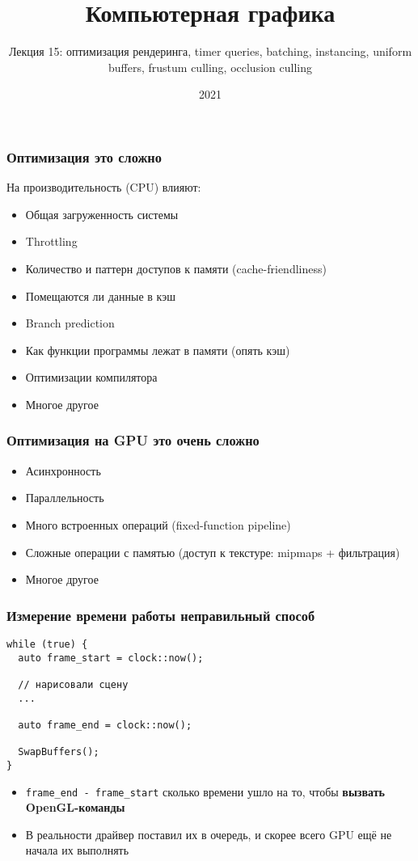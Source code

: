 \documentclass{beamer}
\title{Компьютерная графика}
\subtitle{Лекция 15: оптимизация рендеринга, timer queries, batching, instancing, uniform buffers, frustum culling, occlusion culling}
\date{2021}
\begin{document}
\frame{\titlepage}

\begin{frame}[fragile]
\frametitle{Оптимизация \textendash{} это сложно}
На производительность (CPU) влияют:
\pause
\begin{itemize}
\item Общая загруженность системы
\pause
\item Throttling
\pause
\item Количество и паттерн доступов к памяти (cache-friendliness)
\pause
\item Помещаются ли данные в кэш
\pause
\item Branch prediction
\pause
\item Как функции программы лежат в памяти (опять кэш)
\pause
\item Оптимизации компилятора
\pause
\item Многое другое
\end{itemize}
\end{frame}

\begin{frame}[fragile]
\frametitle{Оптимизация на GPU \textendash{} это очень сложно}
\begin{itemize}
\item Асинхронность
\pause
\item Параллельность
\pause
\item Много встроенных операций (fixed-function pipeline)
\pause
\item Сложные операции с памятью (доступ к текстуре: mipmaps + фильтрация)
\pause
\item Многое другое
\end{itemize}
\end{frame}

\begin{frame}[fragile]
\frametitle{Измерение времени работы \textendash{} неправильный способ}
\begin{verbatim}
while (true) {
  auto frame_start = clock::now();

  // нарисовали сцену
  ...

  auto frame_end = clock::now();

  SwapBuffers();
}
\end{verbatim}
\pause
\begin{itemize}
\item \verb|frame_end - frame_start| \textendash{} сколько времени ушло на то, чтобы \textbf{вызвать OpenGL-команды}
\pause
\item В реальности драйвер поставил их в очередь, и скорее всего GPU ещё не начала их выполнять
\end{itemize}
\end{frame}
\end{document}
